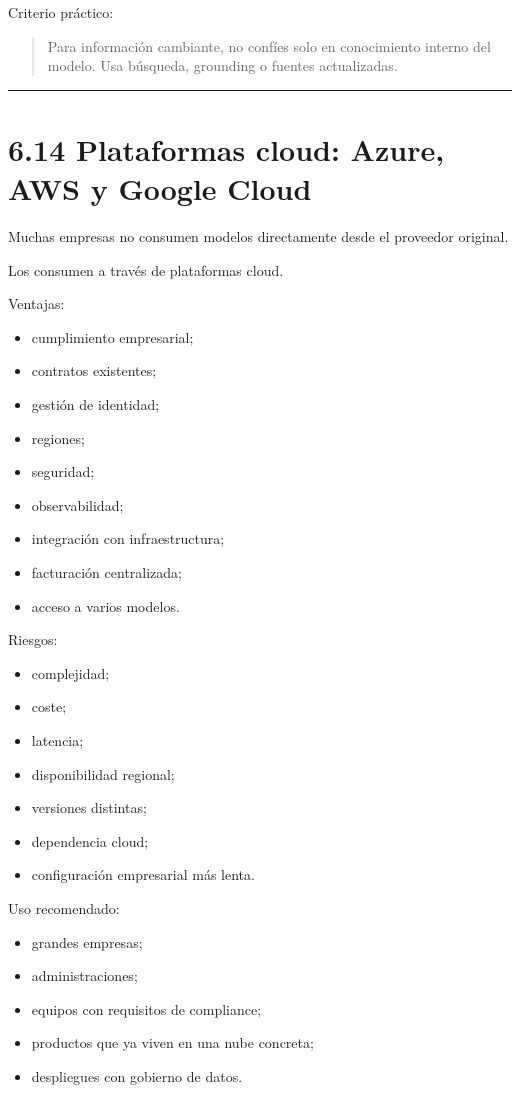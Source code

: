 Criterio práctico:

\begin{quote}
Para información cambiante, no confíes solo en conocimiento interno del
modelo. Usa búsqueda, grounding o fuentes actualizadas.
\end{quote}

\begin{center}\rule{0.5\linewidth}{0.5pt}\end{center}

\section{6.14 Plataformas cloud: Azure, AWS y Google
Cloud}\label{plataformas-cloud-azure-aws-y-google-cloud}

Muchas empresas no consumen modelos directamente desde el proveedor
original.

Los consumen a través de plataformas cloud.

Ventajas:

\begin{itemize}
\tightlist
\item
  cumplimiento empresarial;
\item
  contratos existentes;
\item
  gestión de identidad;
\item
  regiones;
\item
  seguridad;
\item
  observabilidad;
\item
  integración con infraestructura;
\item
  facturación centralizada;
\item
  acceso a varios modelos.
\end{itemize}

Riesgos:

\begin{itemize}
\tightlist
\item
  complejidad;
\item
  coste;
\item
  latencia;
\item
  disponibilidad regional;
\item
  versiones distintas;
\item
  dependencia cloud;
\item
  configuración empresarial más lenta.
\end{itemize}

Uso recomendado:

\begin{itemize}
\tightlist
\item
  grandes empresas;
\item
  administraciones;
\item
  equipos con requisitos de compliance;
\item
  productos que ya viven en una nube concreta;
\item
  despliegues con gobierno de datos.
\end{itemize}

